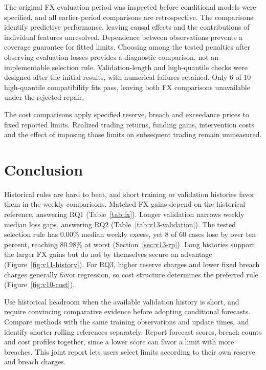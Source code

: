 \documentclass{rQUF2e}
\begin{document}
The original FX evaluation period was inspected before conditional models were specified, and all earlier-period comparisons are retrospective. The comparisons identify predictive performance, leaving causal effects and the contributions of individual features unresolved. Dependence between observations prevents a coverage guarantee for fitted limits. Choosing among the tested penalties after observing evaluation losses provides a diagnostic comparison, not an implementable selection rule. Validation-length and high-quantile checks were designed after the initial results, with numerical failures retained. Only 6 of 10 high-quantile compatibility fits pass, leaving both FX comparisons unavailable under the rejected repair.

The cost comparisons apply specified reserve, breach and exceedance prices to fixed reported limits. Realized trading returns, funding gains, intervention costs and the effect of imposing those limits on subsequent trading remain unmeasured.

\FloatBarrier

\section{Conclusion}\label{sec:conclusion}

Historical rules are hard to beat, and short training or validation histories favor them in the weekly comparisons. Matched FX gains depend on the historical reference, answering RQ1 (Table~\ref{tab:fx}). Longer validation narrows weekly median loss gaps, answering RQ2 (Table~\ref{tab:v13-validation}). The tested selection rule has 0.00\% median weekly excess, yet 8 of 60 cases lose by over ten percent, reaching 80.98\% at worst (Section~\ref{sec:v13-rp}). Long histories support the larger FX gains but do not by themselves secure an advantage (Figure~\ref{fig:v11-history}). For RQ3, higher reserve charges and lower fixed breach charges generally favor regression, so cost structure determines the preferred rule (Figure~\ref{fig:v10-cost}).

Use historical headroom when the available validation history is short, and require convincing comparative evidence before adopting conditional forecasts. Compare methods with the same training observations and update times, and identify shorter rolling references separately. Report forecast scores, breach counts and cost profiles together, since a lower score can favor a limit with more breaches. This joint report lets users select limits according to their own reserve and breach charges.
\end{document}

